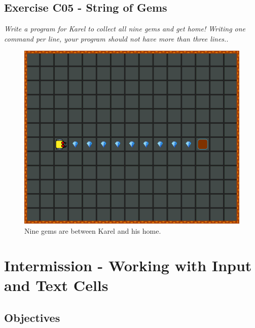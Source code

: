 {{{{\newpage

\subsection{Exercise C05 - String of Gems}

{\em Write a program for Karel to collect all nine gems and get home! 
Writing one command per line, your program should not have more 
than three lines.}.

\begin{figure}[!ht]
\begin{center}
\includegraphics[height=0.4\textwidth]{imgk/c05.png}
\end{center}
\vspace{-4mm}
\caption{Nine gems are between Karel and his home.}
\label{fig:c05}
\end{figure}
\noindent


\section{Intermission - Working with Input and Text Cells} \label{sec:editmenu}

\subsection{Objectives} 
 
}}}}
